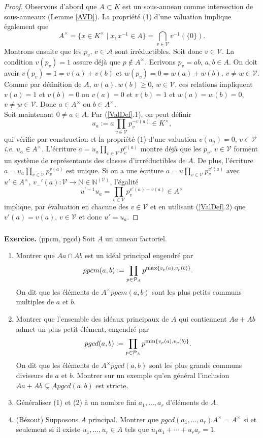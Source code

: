 \documentclass[a4paper, 12pt]{amsart}
\newcommand{\N}{\mathbb{N}}
\begin{document}
\begin{proof}Observons d'abord que  $A\subset K$ est un sous-anneau comme intersection de sous-anneaux (Lemme \ref{AVD}). La propriété (1) d'une valuation implique également que $$A^\times=\lbrace x\in K^\times\;|\; x,x^{-1}\in A\rbrace =\displaystyle{\bigcap_{v\in\mathcal{V}}v^{-1}(\lbrace 0\rbrace)}.$$  
\noindent Montrons ensuite que les $p_v$, $v\in\mathcal{A}$ sont irréductibles.  Soit donc $v\in \mathcal{V}$. La condition $v(p_v)=1$ assure déjà que $p\notin A^\times$. Ecrivons $p_v=ab$, $a,b\in A$. On doit avoir $v(p_v)=1=v(a)+v(b)$ et $w(p_v)=0=w(a)+w(b)$, $v\not=w\in\mathcal{V}$. Comme par définition de $A$, $w(a),w(b)\geq 0$, $w\in\mathcal{V}$, ces relations impliquent $v(a)=1$ et $v(b)=0$ ou $v(a)=0$ et $v(b)=1$ et $w(a)=w(b)=0$, $v\not=w\in\mathcal{V}$. Donc $a\in A^\times$ ou $b\in A^\times$.\\
\noindent Soit maintenant $0\not=a\in A$. Par (\ref{ValDef}.1), on peut définir  $$u_a:=a\prod_{v\in\mathcal{V}}p_v^{-v(a)}\in K^\times,$$
qui vérifie par construction et la propriété (1) d'une valuation $v(u_a)=0$, $v\in\mathcal{V}$ \textit{i.e.} $u_a\in A^\times$. L'écriture  $a=u_a\prod_{v\in\mathcal{V}}p_v^{v(a)}$ montre déjà que les $p_v$, $v\in\mathcal{V}$ forment  un système de représentants des classes d'irrréductibles de $A$. De plus, l'écriture $a=u_a\prod_{v\in\mathcal{V}}p_v^{v(a)}$ est unique.  Si on a une écriture $a=u\prod_{v\in\mathcal{V}}p_v^{v'(a)}$
avec $u'\in A^\times$, $v_-'(a):\mathcal{V}\rightarrow \N\in\N^{(\mathcal{V})}$, l'égalité
 $$u^{'-1} u_a=\prod_{v\in\mathcal{V}}p_v^{v'(a)-v(a)}\in A^\times$$
implique, par évaluation en chacune des $v\in\mathcal{V}$ et en utilisant (\ref{ValDef}.2) que $v'(a)=v(a)$, $v\in\mathcal{V}$ et donc $u'=u_a$.
\end{proof}

\subsubsection{}\noindent\textbf{Exercice.} (ppcm, pgcd) Soit $A$ un anneau factoriel. 
\begin{enumerate}
\item Montrer que $Aa\cap Ab$ est un idéal principal engendré par 
$$ppcm(a, b):=\prod_{p\in\mathcal{P}_A}p^{\hbox{\rm \footnotesize max}\lbrace v_p(a),v_p(b)\rbrace}.$$
On dit que les éléments de $A^\times ppcm(a, b) $ sont les plus petits communs multiples de $a$ et $b$.
\item Montrer que l'ensemble des idéaux principaux de $A$ qui contiennent $Aa+ Ab$ admet un plus petit élément, engendré par
$$pgcd(a, b):=\prod_{p\in\mathcal{P}_A}p^{\hbox{\rm \footnotesize min}\lbrace v_p(a),v_p(b)\rbrace}.$$
On dit que les éléments de $A^\times pgcd(a, b) $ sont les plus grands communs diviseurs de $a$ et $b$. Montrer sur un exemple qu'en général l'inclusion $Aa+Ab\subsetneq Apgcd(a,b)$ est stricte.
\item Généraliser  (1) et (2) à un nombre fini $a_1,\dots, a_r$ d'éléments de $A$.
\item (Bézout) Supposons $A$ principal. Montrer que $pgcd(a_1,\dots, a_r)A^\times= A^\times$ si et seulement si il existe $u_1,\dots, u_r\in A$ tels que $u_1a_1+\cdots+u_ra_r=1$.
\end{enumerate}
\end{document}
